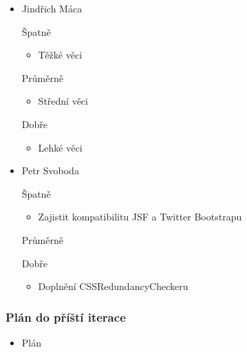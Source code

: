 \documentclass{beamer}
\begin{document}
\begin{frame}[allowframebreaks]
\begin{itemize}
    \item Jindřich Máca
      \begin{block}{Špatně} %
       \begin{itemize}
        \item Těžké věci
       \end{itemize}
     \end{block}
     \begin{block}{Průměrně} %
        \begin{itemize}
        \item Střední věci
       \end{itemize}
     \end{block}
     \begin{block}{Dobře} %
       \begin{itemize}
        \item Lehké věci
       \end{itemize}
     \end{block}
   
    \item Petr Svoboda
      \begin{block}{Špatně} %
       \begin{itemize}
        \item Zajistit kompatibilitu JSF a Twitter Bootstrapu
       \end{itemize}
     \end{block}
     \begin{block}{Průměrně} %
        \begin{itemize}
       \end{itemize}
     \end{block}
     \begin{block}{Dobře} %
       \begin{itemize}
        \item Doplnění CSSRedundancyCheckeru
       \end{itemize}
     \end{block}
   \end{itemize}
\end{frame}

\begin{frame}[allowframebreaks]\frametitle{Plán do příští iterace}
  \begin{itemize}
    \item Plán
  \end{itemize}
\end{frame}
\end{document}
